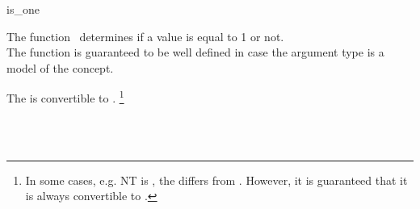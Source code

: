 \begin{ccRefFunction}{is_one}

\ccDefinition

The function \ccRefName\ determines if a value is equal to 1 or not.\\
The function is guaranteed to be well defined in case the argument type 
is a model of the  concept. 


        { The  is convertible to . 
          \footnote{In some cases, e.g. NT is , the 
           differs from . 
          However, it is guaranteed that it is always convertible to .}
        }


\ccSeeAlso

\\
\\

\end{ccRefFunction}

